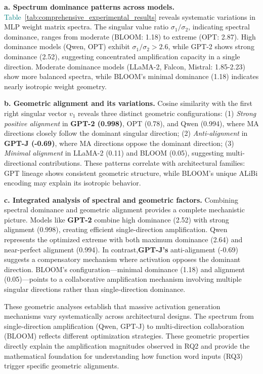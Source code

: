 \documentclass[conference]{IEEEtran}
\begin{document}
\smallskip
\noindent\textbf{a. Spectrum dominance patterns across models.}
\textcolor{teal}{Table~\ref{tab:comprehensive_experimental_results}} reveals systematic variations in MLP weight matrix spectra. The singular value ratio $\sigma_1/\sigma_2$, indicating spectral dominance, ranges from moderate (BLOOM: 1.18) to extreme (OPT: 2.87). High dominance models (Qwen, OPT) exhibit $\sigma_1/\sigma_2 > 2.6$, while GPT-2 shows strong dominance (2.52), suggesting concentrated amplification capacity in a single direction. Moderate dominance models (LLaMA-2, Falcon, Mistral: 1.85-2.23) show more balanced spectra, while BLOOM's minimal dominance (1.18) indicates nearly isotropic weight geometry.

\smallskip
\noindent\textbf{b. Geometric alignment and its variations.}
Cosine similarity with the first right singular vector $v_1$ reveals three distinct geometric configurations: (1) \textit{Strong positive alignment} in \textbf{GPT-2 (0.998)}, OPT (0.78), and Qwen (0.994), where MA directions closely follow the dominant singular direction; (2) \textit{Anti-alignment} in \textbf{GPT-J (-0.69)}, where MA directions oppose the dominant direction; (3) \textit{Minimal alignment} in LLaMA-2 (0.11) and BLOOM (0.05), suggesting multi-directional contributions. These patterns correlate with architectural families: GPT lineage shows consistent geometric structure, while BLOOM's unique ALiBi encoding may explain its isotropic behavior.

\smallskip
\noindent\textbf{c. Integrated analysis of spectral and geometric factors.}
Combining spectral dominance and geometric alignment provides a complete mechanistic picture. Models like \textbf{GPT-2} combine high dominance (2.52) with strong alignment (0.998), creating efficient single-direction amplification. Qwen represents the optimized extreme with both maximum dominance (2.64) and near-perfect alignment (0.994). In contrast,\textbf{GPT-J's} anti-alignment (-0.69) suggests a compensatory mechanism where activation opposes the dominant direction. BLOOM's configuration—minimal dominance (1.18) and alignment (0.05)—points to a collaborative amplification mechanism involving multiple singular directions rather than single-direction dominance.

These geometric analyses establish that massive activation generation mechanisms vary systematically across architectural designs. The spectrum from single-direction amplification (Qwen, GPT-J) to multi-direction collaboration (BLOOM) reflects different optimization strategies. These geometric properties directly explain the amplification magnitudes observed in RQ2 and provide the mathematical foundation for understanding how function word inputs (RQ3) trigger specific geometric alignments.
\end{document}
